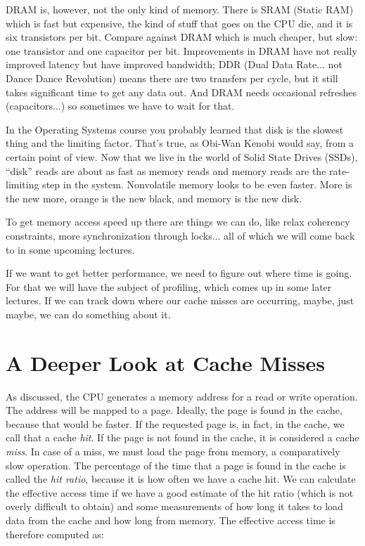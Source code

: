 DRAM is, however, not the only kind of memory. There is SRAM (Static RAM) which is fast but expensive, the kind of stuff that goes on the CPU die, and it is six transistors per bit. Compare against DRAM which is much cheaper, but slow: one transistor and one capacitor per bit. Improvements in DRAM have not really improved latency but have improved bandwidth; DDR (Dual Data Rate... not Dance Dance Revolution) means there are two transfers per cycle, but it still takes significant time to get any data out. And DRAM needs occasional refreshes (capacitors...) so sometimes we have to wait for that.

In the Operating Systems course you probably learned that disk is the slowest thing and the limiting factor. That's true, as Obi-Wan Kenobi would say, from a certain point of view. Now that we live in the world of Solid State Drives (SSDs), ``disk'' reads are about as fast as memory reads and memory reads are the rate-limiting step in the system. Nonvolatile memory looks to be even faster. More is the new more, orange is the new black, and memory is the new disk.

To get memory access speed up there are things we can do, like relax coherency constraints, more synchronization through locks... all of which we will come back to in some upcoming lectures. 

If we want to get better performance, we need to figure out where time is going. For that we will have the subject of profiling, which comes up in some later lectures. If we can track down where our cache misses are occurring, maybe, just maybe, we can do something about it. 

\section*{A Deeper Look at Cache Misses}

As discussed, the CPU generates a memory address for a read or write operation. The address will be mapped to a page. Ideally, the page is found in the cache, because that would be faster. If the requested page is, in fact,  in the cache, we call that a cache \textit{hit}. If the page is not found in the cache, it is considered a cache \textit{miss}. In case of a miss, we must load the page from memory, a comparatively slow operation. The percentage of the time that a page is found in the cache is called the \textit{hit ratio}, because it is how often we have a cache hit. We can calculate the effective access time if we have a good estimate of the hit ratio (which is not overly difficult to obtain) and some measurements of how long it takes to load data from the cache and how long from memory. The effective access time is therefore computed as:

